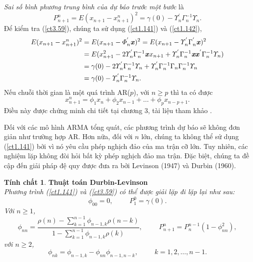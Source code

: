 \documentclass[12pt, a4paper,oneside]{book}
\theoremstyle{definition}
\newtheorem{tc}[theo]{Tính chất}
\begin{document}
\textit{Sai số bình phương trung bình của dự báo trước một bước} là
\begin{equation}
P_{n+1}^{n} = E (x_{n+1} - x_{n+1}^{n})^{2} = \gamma(0) - \varUpsilon^{'}_{n}\Gamma_n^{-1}\varUpsilon_{n}. \label{ct3.59}
\end{equation}	
Để kiểm tra (\ref{ct3.59}), chúng ta sử dụng (\ref{ct1.141}) và (\ref{ct1.142}),
\begin{align*}
E(x_{n+1}- x_{n+1}^{n})^{2} &= E(x_{n+1} - \varPhi_{n}^{'}\textbf{\textit{x}})^{2}= E(x_{n+1} - \varUpsilon_n^{'}\Gamma^{'}_{n}\textbf{\textit{x}})^{2}\\& = E(x_{n+1}^{2} - 2\varUpsilon^{'}_{n}\Gamma^{-1}_{n}\textbf{\textit{x}}x_{n+1} + \varUpsilon^{'}_{n}\Gamma^{-1}_{n}\textbf{\textit{xx}}^{'}\Gamma^{-1}_{n}\varUpsilon_{n})\\ & =\gamma(0) -2\varUpsilon^{'}_{n}\Gamma^{-1}_{n}\varUpsilon_n+ \varUpsilon^{'}_{n}\Gamma^{-1}_{n}\Gamma_n\Gamma_n^{-1}\varUpsilon_n\\ & =\gamma(0)-\varUpsilon_n^{'}\Gamma_n^{-1}\varUpsilon_n.
\end{align*}
Nếu chuỗi thời gian là một quá trình AR($p$), với $n\geq p$ thì ta có được
\begin{equation}
x_{n+1}^{n}=\phi_1x_n+\phi_2x_{n-1}+\dots+\phi_px_{n-p+1}. \label{ct3.60}
\end{equation}
Điều này được chứng minh chi tiết tại chương 3, tài liệu tham khảo \cite{8}.

Đối với các mô hình ARMA tổng quát, các phương trình dự báo sẽ không đơn giản như trường hợp AR. Hơn nữa, đối với $n$ lớn, chúng ta không thể sử dụng (\ref{ct1.141}) bởi vì nó yêu cầu phép nghịch đảo của ma trận cỡ lớn. Tuy nhiên, các nghiệm lặp không đòi hỏi bất kỳ phép nghịch đảo ma trận. Đặc biệt, chúng ta đề cập đến giải pháp đệ quy được đưa ra bởi Levinson (1947) và Durbin (1960).
\begin{tc}\cite{8} \textbf{Thuật toán  Durbin-Levinson}\\
	\textit{Phương trình (\ref{ct1.141}) và (\ref{ct3.59}) có thể được giải lặp đi lặp lại như sau: 
		\begin{equation}
		\phi_{00}= 0, \hspace{1cm} P_{1}^{0}= \gamma(0). \label{ct1.144}
		\end{equation} 
		Với $n\geq 1$,
		\begin{equation}
		\phi_{nn} = \dfrac{\rho(n) - \sum_{k=1}^{n-1}\phi_{n-1,k}\rho
			(n-k)}{1- \sum_{k=1}^{n-1}\phi_{n-1,k}\rho(k)}, \hspace{1cm}  P_{n+1}^{n}= P_{n}^{n-1}(1 - \phi_{nn}^{2}), \label{ct1.145}
		\end{equation}
		với $n\geq 2$,
		\begin{equation}
		\phi_{nk} = \phi_{n-1,k}- \phi_{nn}\phi_{n-1,n-k}, \hspace{1cm}  k=1, 2, \dots, n-1. \label{ct1.146}
		\end{equation}}
\end{tc}
\end{document}
